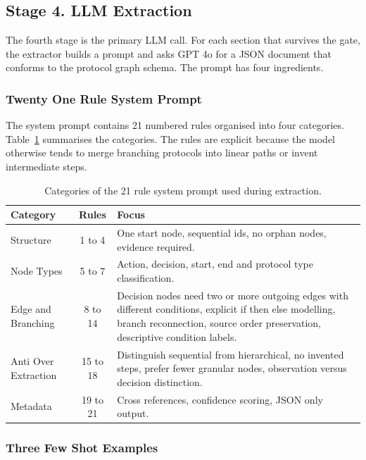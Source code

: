 \documentclass{article}
\begin{document}
\subsection{Stage 4. LLM Extraction}

The fourth stage is the primary LLM call. For each section that
survives the gate, the extractor builds a prompt and asks GPT 4o for a
JSON document that conforms to the protocol graph schema. The prompt
has four ingredients.

\subsubsection{Twenty One Rule System Prompt}

The system prompt contains 21 numbered rules organised into four
categories. Table~\ref{tab:prompt-rules} summarises the categories.
The rules are explicit because the model otherwise tends to merge
branching protocols into linear paths or invent intermediate steps.

\begin{table}[H]
\centering
\begin{tabularx}{\textwidth}{l c X}
\toprule
\textbf{Category} & \textbf{Rules} & \textbf{Focus} \\
\midrule
Structure          & 1 to 4   & One start node, sequential ids, no orphan nodes, evidence required. \\
Node Types         & 5 to 7   & Action, decision, start, end and protocol type classification. \\
Edge and Branching & 8 to 14  & Decision nodes need two or more outgoing edges with different conditions, explicit if then else modelling, branch reconnection, source order preservation, descriptive condition labels. \\
Anti Over Extraction & 15 to 18 & Distinguish sequential from hierarchical, no invented steps, prefer fewer granular nodes, observation versus decision distinction. \\
Metadata           & 19 to 21 & Cross references, confidence scoring, JSON only output. \\
\bottomrule
\end{tabularx}
\caption{Categories of the 21 rule system prompt used during extraction.}
\label{tab:prompt-rules}
\end{table}

\subsubsection{Three Few Shot Examples}
\end{document}
